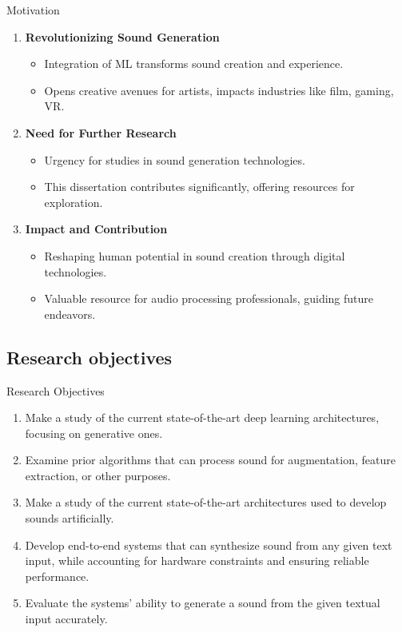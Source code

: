 \begin{frame}{Motivation}
    \begin{enumerate}
        \item \textbf{Revolutionizing Sound Generation}
              \begin{itemize}
                  \item Integration of ML transforms sound creation and experience.
                  \item Opens creative avenues for artists, impacts industries like film, gaming, VR.
              \end{itemize}
        \item \textbf{Need for Further Research}
              \begin{itemize}
                  \item Urgency for studies in sound generation technologies.
                  \item This dissertation contributes significantly, offering resources for exploration.
              \end{itemize}
        \item \textbf{Impact and Contribution}
              \begin{itemize}
                  \item Reshaping human potential in sound creation through digital technologies.
                  \item Valuable resource for audio processing professionals, guiding future endeavors.
              \end{itemize}
    \end{enumerate}
\end{frame}

\subsection{Research objectives}

\begin{frame}{Research Objectives}
    \begin{enumerate}
        \item Make a study of the current state-of-the-art deep learning architectures, focusing on generative ones.
        \item Examine prior algorithms that can process sound for augmentation, feature extraction, or other purposes.
        \item Make a study of the current state-of-the-art architectures used to develop sounds artificially.
        \item Develop end-to-end systems that can synthesize sound from any given text input, while accounting for hardware constraints and ensuring reliable performance.
        \item Evaluate the systems’ ability to generate a sound from the given textual input accurately.
    \end{enumerate}
\end{frame}